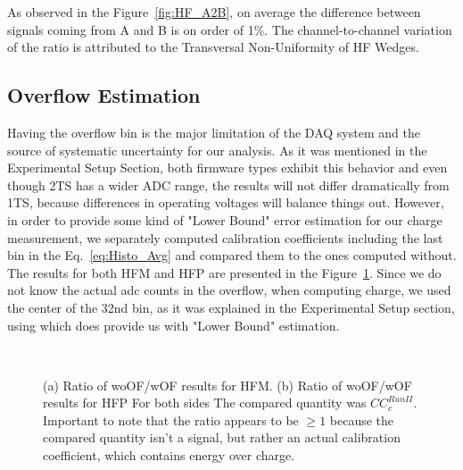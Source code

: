 As observed in the Figure~\ref{fig:HF_A2B}, on average the difference between
signals coming from A and B is on order of 1\%. The channel-to-channel variation
of the ratio is attributed to the Transversal Non-Uniformity of HF Wedges.

\subsection{Overflow Estimation}
Having the overflow bin is the major limitation of the DAQ system and the source of
systematic uncertainty for our analysis. As it was mentioned in the Experimental
Setup Section, both firmware types exhibit this behavior and even though 2TS
has a wider ADC range, the results will not differ dramatically from 1TS, because
differences in operating voltages will balance things out. However, in order to
provide some kind of "Lower Bound" error estimation for our charge measurement,
we separately computed calibration coefficients including the last bin in the
Eq.~\ref{eq:Histo_Avg} and compared them to the ones computed without. The results
for both HFM and HFP are presented in the Figure~\ref{fig:HF_Overflow}. Since we
do not know the actual adc counts in the overflow, when computing charge, we used
the center of the 32nd bin, as it was explained in the Experimental Setup section,
using which does provide us with "Lower Bound" estimation.

\begin{figure}[!h]
    \begin{center}
        ~
        \caption
        {(a) Ratio of woOF/wOF results for HFM.
         (b) Ratio of woOF/wOF results for HFP
         For both sides The compared quantity was ${CC}^{Run II}_{c}$.
         Important to note that the ratio appears to be $\geq1$ because the compared quantity isn't a signal, but rather an actual calibration coefficient,
         which contains energy over charge.}
        \label{fig:HF_Overflow}
    \end{center}
\end{figure}

